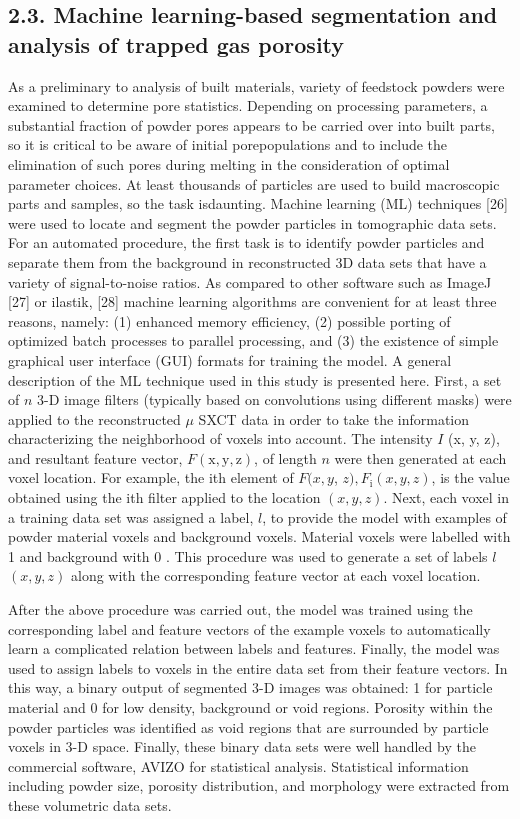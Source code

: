 \documentclass[10pt]{article}
\begin{document}
\subsection*{2.3. Machine learning-based segmentation and analysis of trapped gas porosity}
As a preliminary to analysis of built materials, variety of feedstock powders were examined to determine pore statistics. Depending on processing parameters, a substantial fraction of powder pores appears to be carried over into built parts, so it is critical to be aware of initial porepopulations and to include the elimination of such pores during melting in the consideration of optimal parameter choices. At least thousands of particles are used to build macroscopic parts and samples, so the task isdaunting. Machine learning (ML) techniques [26] were used to locate and segment the powder particles in tomographic data sets. For an automated procedure, the first task is to identify powder particles and separate them from the background in reconstructed 3D data sets that have a variety of signal-to-noise ratios. As compared to other software such as ImageJ [27] or ilastik, [28] machine learning algorithms are convenient for at least three reasons, namely: (1) enhanced memory efficiency, (2) possible porting of optimized batch processes to parallel processing, and (3) the existence of simple graphical user interface (GUI) formats for training the model. A general description of the ML technique used in this study is presented here. First, a set of $n$ 3-D image filters (typically based on convolutions using different masks) were applied to the reconstructed $\mu$ SXCT data in order to take the information characterizing the neighborhood of voxels into account. The intensity $I$ (x, y, z), and resultant feature vector, $F(\mathrm{x}, \mathrm{y}, \mathrm{z})$, of length $n$ were then generated at each voxel location. For example, the ith element of $F(x, y$, $z), F_{\mathrm{i}}(x, y, z)$, is the value obtained using the ith filter applied to the location $(x, y, z)$. Next, each voxel in a training data set was assigned a label, $l$, to provide the model with examples of powder material voxels and background voxels. Material voxels were labelled with 1 and background with 0 . This procedure was used to generate a set of labels $l$ $(x, y, z)$ along with the corresponding feature vector at each voxel location.

After the above procedure was carried out, the model was trained using the corresponding label and feature vectors of the example voxels to automatically learn a complicated relation between labels and features. Finally, the model was used to assign labels to voxels in the entire data set from their feature vectors. In this way, a binary output of segmented 3-D images was obtained: 1 for particle material and 0 for low density, background or void regions. Porosity within the powder particles was identified as void regions that are surrounded by particle voxels in 3-D space. Finally, these binary data sets were well handled by the commercial software, AVIZO for statistical analysis. Statistical information including powder size, porosity distribution, and morphology were extracted from these volumetric data sets.
\end{document}
